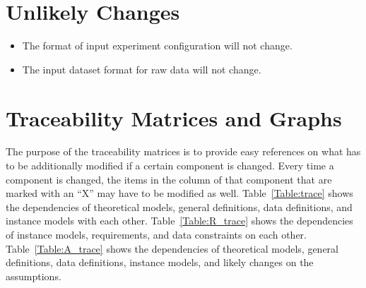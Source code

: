 \documentclass[12pt]{article}
\newcounter{lcnum} %
\begin{document}
\section{Unlikely Changes}    

\noindent \begin{itemize}

    \item[LC\refstepcounter{lcnum}\thelcnum\label{LC_configuration}:] The format of input experiment configuration will not change.

    \item[LC\refstepcounter{lcnum}\thelcnum\label{LC_dataset}:] The input dataset format for raw data will not change.

\end{itemize}


\newpage








\section{Traceability Matrices and Graphs}


The purpose of the traceability matrices is to provide easy references on what
has to be additionally modified if a certain component is changed.  Every time a
component is changed, the items in the column of that component that are marked
with an ``X'' may have to be modified as well.  Table~\ref{Table:trace} shows the
dependencies of theoretical models, general definitions, data definitions, and
instance models with each other. Table~\ref{Table:R_trace} shows the
dependencies of instance models, requirements, and data constraints on each
other. Table~\ref{Table:A_trace} shows the dependencies of theoretical models,
general definitions, data definitions, instance models, and likely changes on
the assumptions.
\end{document}
